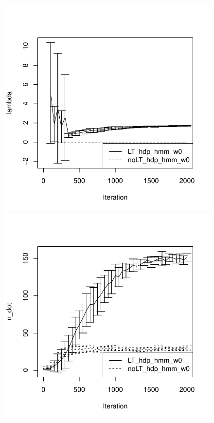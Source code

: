 \begin{figure}[tb]
\begin{minipage}{0.40\textwidth}
  \includegraphics[width = \textwidth]{fig/cocktail_s16_m12/w0/h10.0_nocs_cp1/lambda.pdf}
\end{minipage}
\begin{minipage}{0.40\textwidth}
  \includegraphics[width = \textwidth]{fig/cocktail_s16_m12/w0/h10.0_nocs_cp1/n_dot.pdf}

\end{minipage}
\end{figure}
